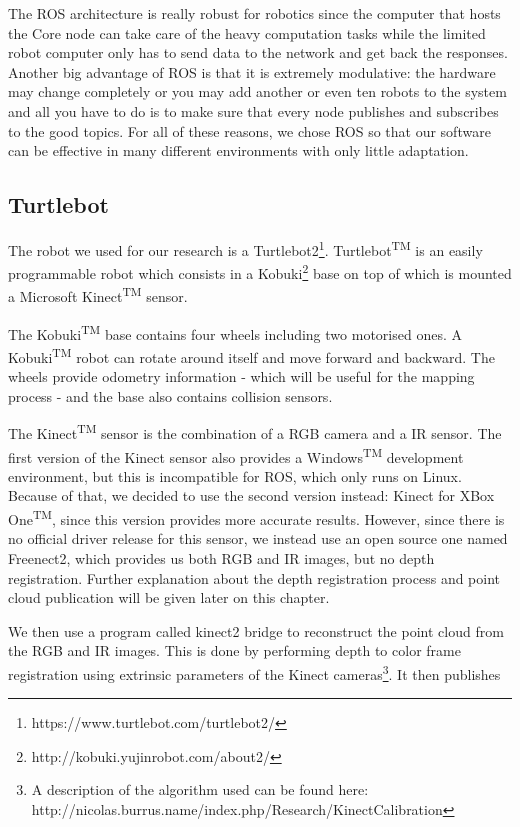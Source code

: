 The ROS architecture is really robust for robotics since the computer that hosts the Core node can take care of the heavy computation tasks while the limited robot computer only has to send data to the network and get back the responses. Another big advantage of ROS is that it is extremely modulative: the hardware may change completely or you may add another or even ten robots to the system and all you have to do is to make sure that every node publishes and subscribes to the good topics. For all of these reasons, we chose ROS so that our software can be effective in many different environments with only little adaptation.

\subsection{Turtlebot}
The robot we used for our research is a Turtlebot2\footnote{https://www.turtlebot.com/turtlebot2/}. Turtlebot\textsuperscript{TM} is an easily programmable robot which consists in a Kobuki\footnote{http://kobuki.yujinrobot.com/about2/} base on top of which is mounted a Microsoft Kinect\textsuperscript{TM} sensor. 

The Kobuki\textsuperscript{TM} base contains four wheels including two motorised ones. A Kobuki\textsuperscript{TM} robot can rotate around itself and move forward and backward. The wheels provide odometry information - which will be useful for the mapping process - and the base also contains collision sensors.

The Kinect\textsuperscript{TM} sensor is the combination of a RGB camera and a IR sensor. The first version of the Kinect sensor also provides a Windows\textsuperscript{TM} development environment, but this is incompatible for ROS, which only runs on Linux. Because of that, we decided to use the second version instead: Kinect for XBox One\textsuperscript{TM}, since this version provides more accurate results\cite{kinect_comparison}. However, since there is no official driver release for this sensor, we instead use an open source one named Freenect2\cite{libfreenect2}, which provides us both RGB and IR images, but no depth registration. Further explanation about the depth registration process and point cloud publication will be given later on this chapter.

We then use a program called kinect2 bridge\cite{iai_kinect2} to reconstruct the point cloud from the RGB and IR images. This is done by performing depth to color frame registration using extrinsic parameters of the Kinect cameras\footnote{\raggedright A description of the algorithm used can be found here: http://nicolas.burrus.name/index.php/Research/KinectCalibration}.
It then publishes 

